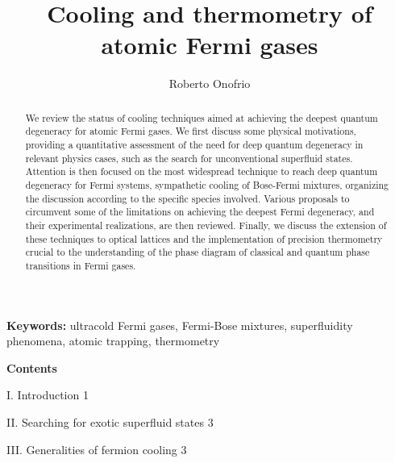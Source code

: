 \documentclass[pra,letterpaper,twocolumn,showpacs,superscriptaddress]{revtex4}
\begin{document}
\title{Cooling and thermometry of atomic Fermi gases}

\author{Roberto Onofrio}



\begin{abstract}
We review the status of cooling techniques aimed at achieving the deepest quantum degeneracy for atomic Fermi gases. 
We first discuss some physical motivations, providing a quantitative assessment of the need for deep quantum degeneracy 
in relevant physics cases, such as the search for unconventional superfluid states. Attention is then focused on the most 
widespread technique to reach deep quantum degeneracy for Fermi systems, sympathetic cooling of Bose-Fermi mixtures, 
organizing the discussion according to the specific species involved. Various proposals to circumvent some of the 
limitations on achieving the deepest Fermi degeneracy, and their experimental realizations, are then reviewed. 
Finally, we discuss the extension of these techniques to optical lattices and the implementation of precision thermometry 
crucial to the understanding of the phase diagram of classical and quantum phase transitions in Fermi gases.
\end{abstract}


\maketitle

\noindent
{\bf Keywords:} ultracold Fermi gases, Fermi-Bose mixtures, superfluidity phenomena, atomic trapping, thermometry

\vspace{0.4cm}

\noindent
{\bf Contents}
\vspace{0.4cm}

I. Introduction \hfill{1}

II. Searching for exotic superfluid states \hfill{3}

III. Generalities of fermion cooling \hfill{3}
\end{document}
